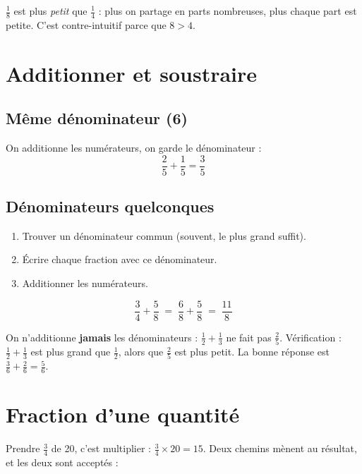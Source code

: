 \documentclass{fiche}
\begin{document}
\begin{piege}
$\tfrac18$ est plus \emph{petit} que $\tfrac14$ : plus on partage en parts nombreuses,
plus chaque part est petite. C'est contre-intuitif parce que $8>4$.
\end{piege}

\section{Additionner et soustraire}

\subsection{Même dénominateur \normalfont(6\ieme{})}
On additionne les numérateurs, on garde le dénominateur :
\[\frac{2}{5}+\frac{1}{5}=\frac{3}{5}\]

\subsection{\niv{5\ieme} Dénominateurs quelconques}

\begin{methode}
\begin{enumerate}[leftmargin=6mm,label=\textbf{\arabic*.}]
  \item Trouver un dénominateur commun (souvent, le plus grand suffit).
  \item Écrire chaque fraction avec ce dénominateur.
  \item Additionner les numérateurs.
\end{enumerate}
\vspace{0.8mm}
\[\frac34+\frac58 \;=\; \frac{6}{8}+\frac58 \;=\; \frac{11}{8}\]
\end{methode}

\begin{piege}
On n'additionne \textbf{jamais} les dénominateurs :
$\tfrac12+\tfrac13$ ne fait pas $\tfrac25$. Vérification : $\tfrac12+\tfrac13$ est
plus grand que $\tfrac12$, alors que $\tfrac25$ est plus petit.
La bonne réponse est $\tfrac36+\tfrac26=\tfrac56$.
\end{piege}

\section{Fraction d'une quantité}

Prendre $\tfrac34$ de 20, c'est multiplier : $\tfrac34\times 20=15$.
Deux chemins mènent au résultat, et les deux sont acceptés :
\end{document}
